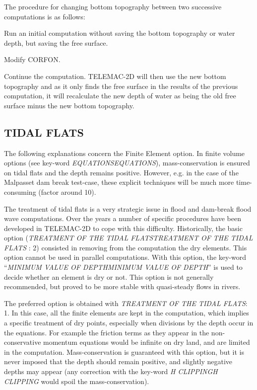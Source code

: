\documentclass{article} %
\begin{document}
 The procedure for changing bottom topography between two successive computations is as follows:

 Run an initial computation without saving the bottom topography or water depth, but saving the free surface.

 Modify CORFON.

 Continue the computation. TELEMAC-2D will then use the new bottom topography and as it only finds the free surface in the results of the previous computation, it will recalculate the new depth of water as being the old free surface minus the new bottom topography.




\subsection{  TIDAL FLATS}

 The following explanations concern the Finite Element option. In finite volume options (see key-word \textit{EQUATIONSEQUATIONS}), mass-conservation is ensured on tidal flats and the depth remains positive. However, e.g. in the case of the Malpasset dam break test-case, these explicit techniques will be much more time-consuming (factor around 10).

 The treatment of tidal flats is a very strategic issue in flood and dam-break flood wave computations. Over the years a number of specific procedures have been developed in TELEMAC-2D to cope with this difficulty. Historically, the basic option (\textit{TREATMENT OF THE TIDAL FLATSTREATMENT OF THE TIDAL FLATS} : 2) consisted in removing from the computation the dry elements. This option cannot be used in parallel computations. With this option, the key-word ``\textit{MINIMUM VALUE OF DEPTHMINIMUM VALUE OF DEPTH}'' is used to decide whether an element is dry or not. This option is not generally recommended, but proved to be more stable with quasi-steady flows in rivers.

 The preferred option is obtained with \textit{TREATMENT OF THE TIDAL FLATS}: 1. In this case, all the finite elements are kept in the computation, which implies a specific treatment of dry points, especially when divisions by the depth occur in the equations. For example the friction terms as they appear in the non-conservative momentum equations would be infinite on dry land, and are limited in the computation. Mass-conservation is guaranteed with this option, but it is never imposed that the depth should remain positive, and slightly negative depths may appear (any correction with the key-word \textit{H CLIPPINGH CLIPPING} would spoil the mass-conservation).
\end{document}
